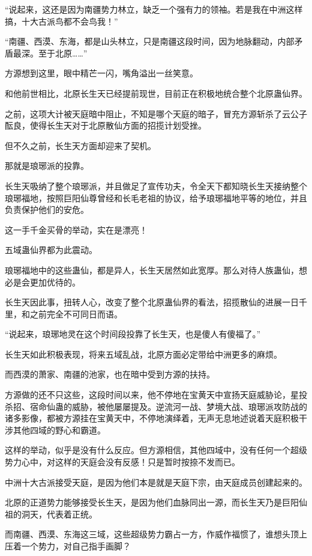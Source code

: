 \begin{this_body}
“说起来，这还是因为南疆势力林立，缺乏一个强有力的领袖。若是我在中洲这样搞，十大古派鸟都不会鸟我！”

“南疆、西漠、东海，都是山头林立，只是南疆这段时间，因为地脉翻动，内部矛盾最深。至于北原……”

方源想到这里，眼中精芒一闪，嘴角溢出一丝笑意。

和他前世相比，北原长生天已经提前现世，目前正在积极地统合整个北原蛊仙界。

之前，这项大计被天庭暗中阻止，不知是哪个天庭的暗子，冒充方源斩杀了云公子酝良，使得长生天对于北原散仙方面的招揽计划受挫。

但不久之前，长生天方面却迎来了契机。

那就是琅琊派的投靠。

长生天吸纳了整个琅琊派，并且做足了宣传功夫，令全天下都知晓长生天接纳整个琅琊福地，按照巨阳仙尊曾经和长毛老祖的协议，给予琅琊福地平等的地位，并且负责保护他们的安危。

这一手千金买骨的举动，实在是漂亮！

五域蛊仙界都为此震动。

琅琊福地中的这些蛊仙，都是异人，长生天居然如此宽厚。那么对待人族蛊仙，想必是会更加优待的。

长生天因此事，扭转人心，改变了整个北原蛊仙界的看法，招揽散仙的进展一日千里，和之前完全不可同日而语。

“说起来，琅琊地灵在这个时间段投靠了长生天，也是傻人有傻福了。”

长生天如此积极表现，将来五域乱战，北原方面必定带给中洲更多的麻烦。

而西漠的萧家、南疆的池家，也在暗中受到方源的扶持。

方源做的还不只这些，这段时间以来，他不停地在宝黄天中宣扬天庭威胁论，星投杀招、宿命仙蛊的威胁，被他屡屡提及。逆流河一战、梦境大战、琅琊派攻防战的诸多影像，都被方源挂在宝黄天中，不停地演绎着，无声无息地述说着天庭积极干涉其他四域的野心和霸道。

这样的举动，似乎是没有什么反应。但方源相信，其他四域中，没有任何一个超级势力心中，对这样的天庭会没有反感！只是暂时按捺不发而已。

中洲十大古派接受天庭，是因为他们本是就是天庭下宗，由天庭成员创建起来的。

北原的正道势力能够接受长生天，是因为他们血脉同出一源，而长生天乃是巨阳仙祖的洞天，代表着正统。

而南疆、西漠、东海这三域，这些超级势力霸占一方，作威作福惯了，谁想头顶上压着一个势力，对自己指手画脚？


\end{this_body}
